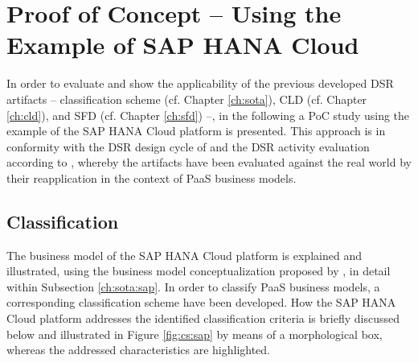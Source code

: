 \chapter{Proof of Concept -- Using the Example of SAP HANA Cloud}\label{ch:poc}

In order to evaluate and show the applicability of the previous developed \ac{DSR} artifacts -- classification scheme (cf. Chapter \ref{ch:sota}), \ac{CLD} (cf. Chapter \ref{ch:cld}), and \ac{SFD} (cf. Chapter \ref{ch:sfd}) --, in the following a \acf{PoC} study using the example of the SAP HANA Cloud platform is presented. This approach is in conformity with the \ac{DSR} design cycle of \citet[pp. 88,90-91]{Hevner2007} and the \ac{DSR} activity evaluation according to \citet[p. 56]{Peffers2007}, whereby the artifacts have been evaluated against the real world by their reapplication in the context of \ac{PaaS} business models.

\section{Classification}\label{ch:poc:cs}

The business model of the SAP HANA Cloud platform is explained and illustrated, using the business model conceptualization proposed by \citet{Johnson2008}, in detail within Subsection \ref{ch:sota:sap}. In order to classify \ac{PaaS} business models, a corresponding classification scheme have been developed. How the SAP HANA Cloud platform addresses the identified classification criteria is briefly discussed below and illustrated in Figure \ref{fig:cs:sap} by means of a morphological box, whereas the addressed characteristics are highlighted.

